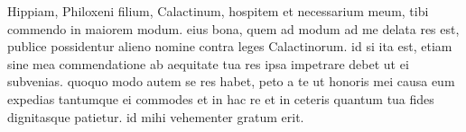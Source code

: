 


Hippiam, Philoxeni filium, Calactinum, hospitem et necessarium meum, tibi commendo in maiorem modum. eius bona, quem ad modum ad me delata res est, publice possidentur alieno nomine contra leges Calactinorum. id si ita est, etiam sine mea commendatione ab aequitate tua
res ipsa impetrare debet ut ei subvenias. quoquo modo autem se res habet, peto a te ut honoris mei causa eum expedias tantumque ei commodes et in hac re et in ceteris quantum tua fides dignitasque patietur. id mihi vehementer
gratum erit.
